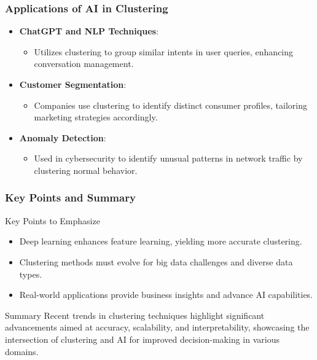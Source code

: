 \documentclass[aspectratio=169]{beamer}
\begin{document}
\begin{frame}[fragile]
    \frametitle{Applications of AI in Clustering}
    \begin{itemize}
        \item \textbf{ChatGPT and NLP Techniques}:
            \begin{itemize}
                \item Utilizes clustering to group similar intents in user queries, enhancing conversation management.
            \end{itemize}
        \item \textbf{Customer Segmentation}:
            \begin{itemize}
                \item Companies use clustering to identify distinct consumer profiles, tailoring marketing strategies accordingly.
            \end{itemize}
        \item \textbf{Anomaly Detection}:
            \begin{itemize}
                \item Used in cybersecurity to identify unusual patterns in network traffic by clustering normal behavior.
            \end{itemize}
    \end{itemize}
\end{frame}

\begin{frame}[fragile]
    \frametitle{Key Points and Summary}
    \begin{block}{Key Points to Emphasize}
        \begin{itemize}
            \item Deep learning enhances feature learning, yielding more accurate clustering.
            \item Clustering methods must evolve for big data challenges and diverse data types.
            \item Real-world applications provide business insights and advance AI capabilities.
        \end{itemize}
    \end{block}
    \begin{block}{Summary}
        Recent trends in clustering techniques highlight significant advancements aimed at accuracy, scalability, and interpretability, showcasing the intersection of clustering and AI for improved decision-making in various domains.
    \end{block}
\end{frame}
\end{document}
